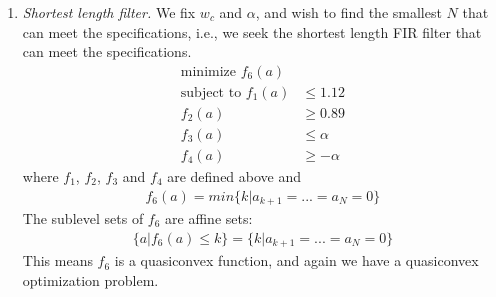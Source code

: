 \documentclass[conference]{IEEEtran}
\begin{document}
\begin{enumerate}[label=(\alph*)]
\item \textit{Shortest length filter.} We fix $w_c$ and $\alpha$, and wish to find the smallest $N$ that can meet the specifications, i.e., we seek the shortest length FIR filter that can meet the specifications.
\begin{align}
\text{minimize } f_6(a)\\
\text{subject to } f_1(a)&\le 1.12\\
				   f_2(a)&\ge 0.89\\
				   f_3(a)&\le \alpha\\
				   f_4(a)&\ge -\alpha
\end{align}
where $f_1$, $f_2$, $f_3$ and $f_4$ are defined above and
\begin{align}
f_6(a) = min\{k|a_{k+1} = ...=a_N=0\}
\end{align}
The sublevel sets of $f_6$ are affine sets:
\begin{align}
\{a|f_6(a)\le k\} = \{k|a_{k+1} = ...=a_N=0\}
\end{align}
This means $f_6$ is a quasiconvex function, and again we have a quasiconvex optimization problem.
\end{enumerate}
\end{document}
